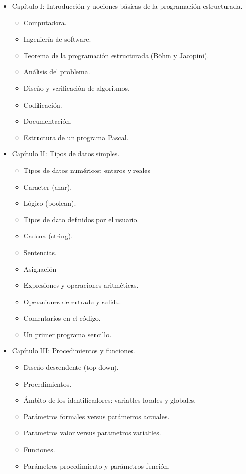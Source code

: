 \documentclass{article}
\begin{document}
\begin{itemize}
\item Capítulo I: Introducción y nociones básicas de la programación estructurada.
	\begin{itemize}
	\item Computadora.
	\item Ingeniería de software.
	\item Teorema de la programación estructurada (Böhm y Jacopini).
	\item Análisis del problema.
	\item Diseño y verificación de algoritmos.
	\item Codificación.
	\item Documentación.
	\item Estructura de un programa Pascal.
	\end{itemize}
\item Capítulo II: Tipos de datos simples.
	\begin{itemize}
	\item Tipos de datos numéricos: enteros y reales.
	\item Caracter (char).
	\item Lógico (boolean).
	\item Tipos de dato definidos por el usuario.
	\item Cadena (string).
	\item Sentencias.
	\item Asignación.
	\item Expresiones y operaciones aritméticas.
	\item Operaciones de entrada y salida.
	\item Comentarios en el código.
	\item Un primer programa sencillo.
	\end{itemize}
\item Capítulo III: Procedimientos y funciones.
	\begin{itemize}
	\item Diseño descendente (top-down).
	\item Procedimientos.
	\item Ámbito de los identificadores: variables locales y globales.
	\item Parámetros formales versus parámetros actuales.
	\item Parámetros valor versus parámetros variables.
	\item Funciones.
	\item Parámetros procedimiento y parámetros función.

\end{itemize}
\end{itemize}
\end{document}
